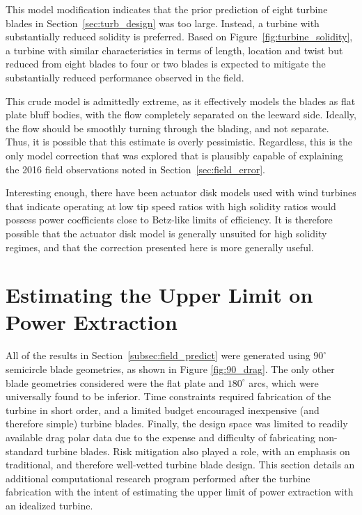 This model modification indicates that the prior prediction of eight
turbine blades in Section~\ref{sec:turb_design} was too large. Instead,
a turbine with substantially reduced solidity is preferred. Based on
Figure~\ref{fig:turbine_solidity}, a turbine with similar
characteristics in terms of length, location and twist but reduced from
eight blades to four or two blades is expected to mitigate the
substantially reduced performance observed in the field. 

This crude model is admittedly extreme, as it effectively models the
blades as flat plate bluff bodies, with the flow completely
separated on the leeward side. Ideally, the flow should be smoothly
turning through the blading, and not separate. Thus, it is possible that
this estimate is overly pessimistic. Regardless, this is the only model
correction that was explored that is plausibly capable of explaining the
2016 field observations noted in Section~\ref{sec:field_error}. 

Interesting enough, there have been actuator disk models used with wind
turbines that indicate operating at low tip speed ratios with high
solidity ratios would possess power coefficients close to Betz-like
limits of efficiency\cite{WE:WE118}. It is therefore possible that the
actuator disk model is generally unsuited for high solidity regimes, and
that the correction presented here is more generally useful. 


\section{Estimating the Upper Limit on Power Extraction}
\label{sec:peak_estimate}

All of the results in Section~\ref{subsec:field_predict} were
generated
using $90^{\circ}$ semicircle blade geometries, as shown in Figure
\ref{fig:90_drag}. The only other blade geometries considered were the
flat plate and $180^{\circ}$ arcs, which were universally found to be
inferior. Time constraints required fabrication of the turbine in short
order, and a limited budget encouraged inexpensive (and therefore
simple) turbine blades. Finally, the design space was limited to
readily available drag polar data due to the expense and difficulty of 
fabricating non-standard turbine blades. Risk mitigation also played a
role, with an emphasis on traditional, and therefore well-vetted turbine
blade design. %
This section details an additional computational research program
performed after the turbine fabrication with the intent of estimating
the upper limit of power extraction with an idealized turbine. 

